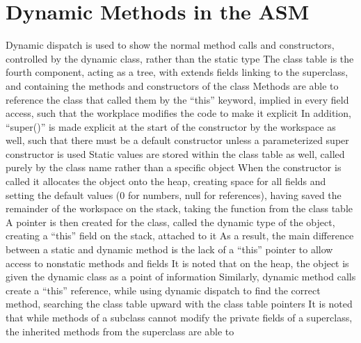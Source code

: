 \documentclass[11 pt, twoside]{article}
\newenvironment{outline*}
{
	\begin{outline}[enumerate]
	}
	{\end{outline}
}
\begin{document}
\section{Dynamic Methods in the ASM}
\begin{outline*}
\1 Dynamic dispatch is used to show the normal method calls and constructors, controlled by the dynamic class, rather than the static type
	\2 The class table is the fourth component, acting as a tree, with extends fields linking to the superclass, and containing the methods and constructors of the class
		\3 Methods are able to reference the class that called them by the ``this'' keyword, implied in every field access, such that the workplace modifies the code to make it explicit
		\3 In addition, ``super()'' is made explicit at the start of the constructor by the workspace as well, such that there must be a default constructor unless a parameterized super constructor is used
		\3 Static values are stored within the class table as well, called purely by the class name rather than a specific object
	\2 When the constructor is called it allocates the object onto the heap, creating space for all fields and setting the default values (0 for numbers, null for references), having saved the remainder of the workspace on the stack, taking the function from the class table
		\3 A pointer is then created for the class, called the dynamic type of the object, creating a ``this'' field on the stack, attached to it
			\4 As a result, the main difference between a static and dynamic method is the lack of a ``this'' pointer to allow access to nonstatic methods and fields
		\3 It is noted that on the heap, the object is given the dynamic class as a point of information
	\2 Similarly, dynamic method calls create a ``this'' reference, while using dynamic dispatch to find the correct method, searching the class table upward with the class table pointers
\1 It is noted that while methods of a subclass cannot modify the private fields of a superclass, the inherited methods from the superclass are able to
\end{outline*}
\end{document}

